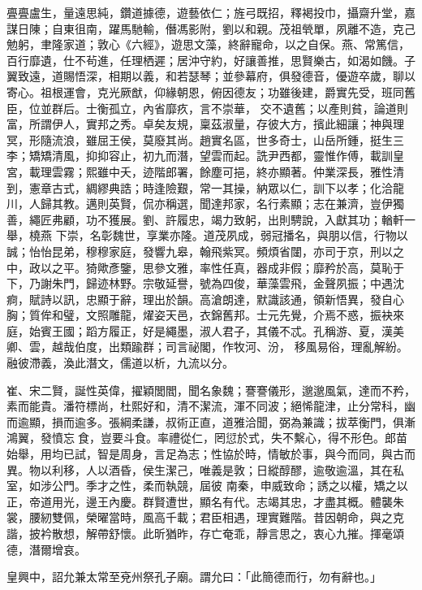 \begin{pinyinscope}
 亹亹盧生，量遠思純，鑽道據德，遊藝依仁；旌弓既招，釋褐投巾，攝齋升堂，嘉謀日陳；自東徂南，躍馬馳輸，僭馮影附，劉以和親。茂祖煢單，夙離不造，克己勉躬，聿隆家道；敦心《六經》，遊思文藻，終辭寵命，以之自保。燕、常篤信，百行靡遺，仕不茍進，任理栖遲；居沖守約，好讓善推，思賢樂古，如渴如饑。子翼致遠，道賜悟深，相期以義，和若瑟琴；並參幕府，俱發德音，優遊卒歲，聊以寄心。祖根運會，克光厥猷，仰緣朝恩，俯因德友；功雖後建，爵實先受，班同舊臣，位並群后。士衡孤立，內省靡疚，言不崇華，
 交不遺舊；以產則貧，論道則富，所謂伊人，實邦之秀。卓矣友規，稟茲淑量，存彼大方，擯此細讓；神與理冥，形隨流浪，雖屈王侯，莫廢其尚。趙實名區，世多奇士，山岳所鍾，挺生三李；矯矯清風，抑抑容止，初九而潛，望雲而起。詵尹西都，靈惟作傅，載訓皇宮，載理雲霧；熙雖中夭，迹階郎署，餘塵可挹，終亦顯著。仲業深長，雅性清到，憲章古式，綢繆典誥；時逢險艱，常一其操，納眾以仁，訓下以孝；化洽龍川，人歸其教。邁則英賢，侃亦稱選，聞達邦家，名行素顯；志在兼濟，豈伊獨善，繩匠弗顧，功不獲展。劉、許履忠，竭力致躬，出則騁說，入獻其功；輶軒一舉，橈燕
 下崇，名彰魏世，享業亦隆。道茂夙成，弱冠播名，與朋以信，行物以誠；怡怡昆弟，穆穆家庭，發響九皋，翰飛紫冥。頻煩省闥，亦司于京，刑以之中，政以之平。猗歟彥鑒，思參文雅，率性任真，器成非假；靡矜於高，莫恥于下，乃謝朱門，歸迹林野。宗敬延譽，號為四俊，華藻雲飛，金聲夙振；中遇沈痾，賦詩以訊，忠顯于辭，理出於韻。高滄朗達，默識該通，領新悟異，發自心胸；質侔和璧，文照雕龍，燿姿天邑，衣錦舊邦。士元先覺，介焉不惑，振袂來庭，始賓王國；蹈方履正，好是繩墨，淑人君子，其儀不忒。孔稱游、夏，漢美卿、雲，越哉伯度，出類踰群；司言祕閣，作牧河、汾，
 移風易俗，理亂解紛。融彼滯義，渙此潛文，儒道以析，九流以分。



 崔、宋二賢，誕性英偉，擢穎閭閻，聞名象魏；謇謇儀形，邈邈風氣，達而不矜，素而能貴。潘符標尚，杜熙好和，清不潔流，渾不同波；絕悕龍津，止分常科，幽而逾顯，損而逾多。張綱柔謙，叔術正直，道雅洽聞，弼為兼識；拔萃衡門，俱漸鴻翼，發憤忘食，豈要斗食。率禮從仁，罔愆於式，失不繫心，得不形色。郎苗始舉，用均已試，智是周身，言足為志；性協於時，情敏於事，與今而同，與古而異。物以利移，人以酒昏，侯生潔己，唯義是敦；日縱醇醪，逾敬逾溫，其在私室，如涉公門。季才之性，柔而執競，屆彼
 南秦，申威致命；誘之以權，矯之以正，帝道用光，邊王內慶。群賢遭世，顯名有代。志竭其忠，才盡其概。體襲朱裳，腰紉雙佩，榮曜當時，風高千載；君臣相遇，理實難階。昔因朝命，與之克諧，披衿散想，解帶舒懷。此昕猶昨，存亡奄乖，靜言思之，衷心九摧。揮毫頌德，潛爾增哀。



 皇興中，詔允兼太常至兗州祭孔子廟。謂允曰：「此簡德而行，勿有辭也。」




\end{pinyinscope}
